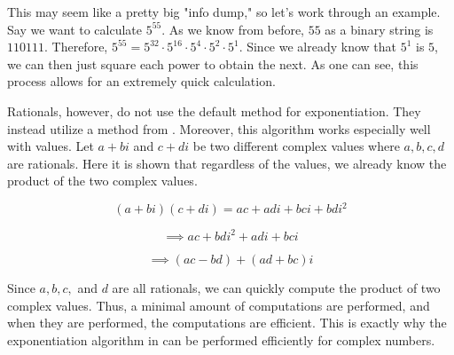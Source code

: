 This may seem like a pretty big "info dump," so let's work through an example.
Say we want to calculate $5^{55}$.
As we know from before, $55$ as a binary string is $110111$.
Therefore, $5^{55} = 5^{32} \cdot 5^{16} \cdot 5^4 \cdot 5^2 \cdot 5^1$.
Since we already know that $5^1$ is $5$, we can then just square each power to obtain the next.
As one can see, this process allows for an extremely quick calculation.

Rationals, however, do not use the default method for exponentiation.
They instead utilize a method from .
Moreover, this algorithm works especially well with  values.
Let $a+bi$ and $c+di$ be two different complex values where $a,b,c,d$ are rationals.
Here it is shown that regardless of the values, we already know the product of the two complex values.

\[
    (a+bi)(c+di) = ac+adi+bci+bdi^2
\]

\[
    \implies ac+bdi^2+adi+bci
\]

\[
    \implies (ac - bd) + (ad + bc)i
\]

Since $a,b,c,$ and $d$ are all rationals, we can quickly compute the product of two complex values.
Thus, a minimal amount of computations are performed, and when they are performed, the computations are efficient.
This is exactly why the exponentiation algorithm in  can be performed efficiently for complex numbers.